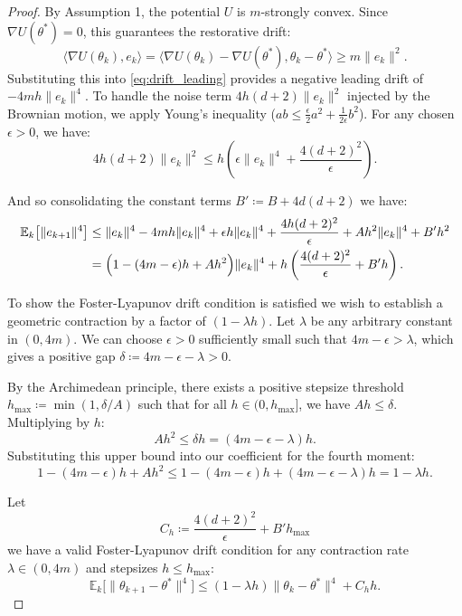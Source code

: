 \begin{proof}
By Assumption 1, the potential $U$ is $m$-strongly convex. Since $\nabla U(\theta^*) = 0$, this guarantees the restorative drift:
\begin{equation}
    \langle \nabla U(\theta_k), e_k \rangle = \langle \nabla U(\theta_k) - \nabla U(\theta^*), \theta_k - \theta^* \rangle \geq m\|e_k\|^2.
\end{equation}
Substituting this into \eqref{eq:drift_leading} provides a negative leading drift of $-4mh\|e_k\|^4$. To handle the noise term $4h(d+2)\|e_k\|^2$ injected by the Brownian motion, we apply Young's inequality ($ab \leq \frac{\epsilon}{2}a^2 + \frac{1}{2\epsilon}b^2$). For any chosen $\epsilon > 0$, we have:
\begin{equation}
    4h(d+2)\|e_k\|^2 \leq h \left( \epsilon\|e_k\|^4 + \frac{4(d+2)^2}{\epsilon} \right).
\end{equation}

And so consolidating the constant terms $B' \coloneqq B + 4d(d+2)$ we have:
\begin{align}
    \mathbb{E}_k\big[\|e_{k+1}\|^4\big] &\leq \|e_k\|^4 - 4mh\|e_k\|^4 + \epsilon h\|e_k\|^4 + \frac{4h(d+2)^2}{\epsilon} + Ah^2\|e_k\|^4 + B'h^2 \notag\\
    &= \Big(1 - (4m - \epsilon)h + Ah^2\Big)\|e_k\|^4 + h\left( \frac{4(d+2)^2}{\epsilon} + B'h \right).
\end{align}

To show the Foster-Lyapunov drift condition is satisfied we wish to establish a geometric contraction by a factor of $(1 - \lambda h)$. Let $\lambda$ be any arbitrary constant in $(0, 4m)$. We can choose $\epsilon > 0$ sufficiently small such that $4m - \epsilon > \lambda$, which gives a positive gap $\delta \coloneqq 4m - \epsilon - \lambda > 0$. 

By the Archimedean principle, there exists a positive stepsize threshold $h_{\max} \coloneqq \min(1, \delta / A)$ such that for all $h \in (0, h_{\max}]$, we have $Ah \leq \delta$. Multiplying by $h$:
\begin{equation}
    Ah^2 \leq \delta h = (4m - \epsilon - \lambda)h.
\end{equation}
Substituting this upper bound into our coefficient for the fourth moment:
\begin{equation}
    1 - (4m - \epsilon)h + Ah^2 \leq 1 - (4m - \epsilon)h + (4m - \epsilon - \lambda)h = 1 - \lambda h.
\end{equation}

Let $$C_h \coloneqq \frac{4(d+2)^2}{\epsilon} + B'h_{\max}$$
we have a valid Foster-Lyapunov drift condition for any contraction rate $\lambda \in (0, 4m)$ and stepsizes $h \leq h_{\max}$:
\begin{equation}
    \mathbb{E}_k\big[\|\theta_{k+1} - \theta^*\|^4\big] \leq (1 - \lambda h)\|\theta_k - \theta^*\|^4 + C_h h.
\end{equation}


\end{proof}
